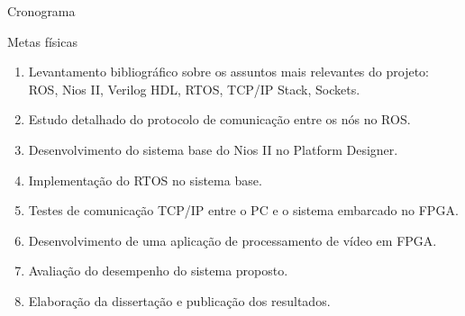 \documentclass[10pt]{beamer}
\begin{document}
{
\begin{frame}{Cronograma}
	\begin{alertblock}{Metas físicas}
        \begin{enumerate}
        	\item Levantamento bibliográfico sobre os assuntos mais relevantes do projeto: ROS, Nios II, Verilog HDL, RTOS, TCP/IP Stack, Sockets.
        	\item Estudo detalhado do protocolo de comunicação entre os nós no ROS.
        	\item Desenvolvimento do sistema base do Nios II no Platform Designer.
        	\item Implementação do RTOS no sistema base.
        	\item Testes de comunicação TCP/IP entre o PC e o sistema embarcado no FPGA.
        	\item Desenvolvimento de uma aplicação de processamento de vídeo em FPGA.
        	\item Avaliação do desempenho do sistema proposto.
        	\item Elaboração da dissertação e publicação dos resultados.
        \end{enumerate}
	\end{alertblock}
\end{frame}
}
\end{document}
